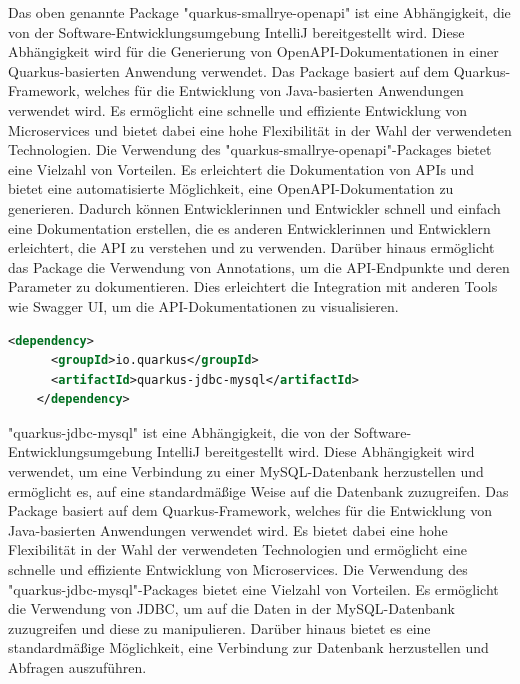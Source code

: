 Das oben genannte Package "quarkus-smallrye-openapi" \cite{SmallRye} ist eine Abhängigkeit, die von der Software-Entwicklungsumgebung IntelliJ bereitgestellt wird. Diese Abhängigkeit wird für die Generierung von OpenAPI-Dokumentationen in einer Quarkus-basierten Anwendung verwendet.
\newline
\newline
Das Package basiert auf dem Quarkus-Framework, welches für die Entwicklung von Java-basierten Anwendungen verwendet wird. Es ermöglicht eine schnelle und effiziente Entwicklung von Microservices und bietet dabei eine hohe Flexibilität in der Wahl der verwendeten Technologien.
\newpage
Die Verwendung des "quarkus-smallrye-openapi"-Packages bietet eine Vielzahl von Vorteilen. Es erleichtert die Dokumentation von APIs und bietet eine automatisierte Möglichkeit, eine OpenAPI-Dokumentation zu generieren. Dadurch können Entwicklerinnen und Entwickler schnell und einfach eine Dokumentation erstellen, die es anderen Entwicklerinnen und Entwicklern erleichtert, die API zu verstehen und zu verwenden.
\newline
\newline
Darüber hinaus ermöglicht das Package die Verwendung von Annotations, um die API-Endpunkte und deren Parameter zu dokumentieren. Dies erleichtert die Integration mit anderen Tools wie Swagger UI, um die API-Dokumentationen zu visualisieren.

\begin{lstlisting}[language=XML,caption=Dependency | jdbc-mysql,label=lst:impl:foo]
    <dependency>
      <groupId>io.quarkus</groupId>
      <artifactId>quarkus-jdbc-mysql</artifactId>
    </dependency>
\end{lstlisting}

"quarkus-jdbc-mysql" \cite{QuarkusDataSource} ist eine Abhängigkeit, die von der Software-Entwicklungsumgebung IntelliJ bereitgestellt wird. Diese Abhängigkeit wird verwendet, um eine Verbindung zu einer MySQL-Datenbank herzustellen und ermöglicht es, auf eine standardmäßige Weise auf die Datenbank zuzugreifen.
\newline
\newline
Das Package basiert auf dem Quarkus-Framework, welches für die Entwicklung von Java-basierten Anwendungen verwendet wird. Es bietet dabei eine hohe Flexibilität in der Wahl der verwendeten Technologien und ermöglicht eine schnelle und effiziente Entwicklung von Microservices.
\newline
\newline
Die Verwendung des "quarkus-jdbc-mysql"-Packages bietet eine Vielzahl von Vorteilen. Es ermöglicht die Verwendung von JDBC, um auf die Daten in der MySQL-Datenbank zuzugreifen und diese zu manipulieren. Darüber hinaus bietet es eine standardmäßige Möglichkeit, eine Verbindung zur Datenbank herzustellen und Abfragen auszuführen.


